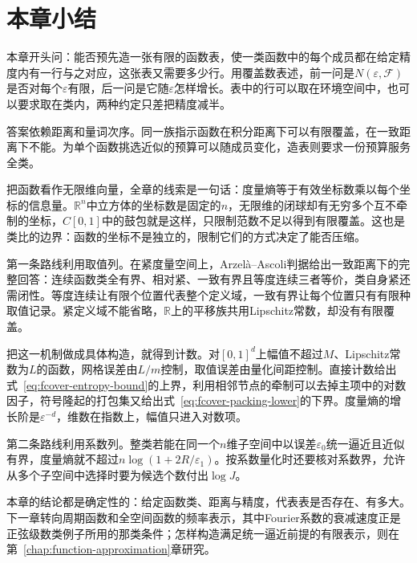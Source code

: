 \section{本章小结}
\label{sec:fcover-summary}

本章开头问：能否预先造一张有限的函数表，使一类函数中的每个成员都在给定精度内有一行与之对应，这张表又需要多少行。用覆盖数表述，前一问是$N(\varepsilon,\mathcal F)$是否对每个$\varepsilon$有限，后一问是它随$\varepsilon$怎样增长。表中的行可以取在环境空间中，也可以要求取在类内，两种约定只差把精度减半。

答案依赖距离和量词次序。同一族指示函数在积分距离下可以有限覆盖，在一致距离下不能。为单个函数挑选近似的预算可以随成员变化，造表则要求一份预算服务全类。

把函数看作无限维向量，全章的线索是一句话：度量熵等于有效坐标数乘以每个坐标的信息量。$\mathbb R^n$中立方体的坐标数是固定的$n$，无限维的闭球却有无穷多个互不牵制的坐标，$C[0,1]$中的鼓包就是这样，只限制范数不足以得到有限覆盖。这也是类比的边界：函数的坐标不是独立的，限制它们的方式决定了能否压缩。

第一条路线利用取值列。在紧度量空间上，Arzelà--Ascoli判据给出一致距离下的完整回答：连续函数类全有界、相对紧、一致有界且等度连续三者等价，类自身紧还需闭性。等度连续让有限个位置代表整个定义域，一致有界让每个位置只有有限种取值记录。紧定义域不能省略，$\mathbb R$上的平移族共用Lipschitz常数，却没有有限覆盖。

把这一机制做成具体构造，就得到计数。对$[0,1]^d$上幅值不超过$M$、Lipschitz常数为$L$的函数，网格误差由$L/m$控制，取值误差由量化间距控制。直接计数给出式~\eqref{eq:fcover-entropy-bound}的上界，利用相邻节点的牵制可以去掉主项中的对数因子，符号隆起的打包集又给出式~\eqref{eq:fcover-packing-lower}的下界。度量熵的增长阶是$\varepsilon^{-d}$，维数在指数上，幅值只进入对数项。

第二条路线利用系数列。整类若能在同一个$n$维子空间中以误差$\varepsilon_0$统一逼近且近似有界，度量熵就不超过$n\log(1+2R/\varepsilon_1)$。按系数量化时还要核对系数界，允许从多个子空间中选择时要为候选个数付出$\log J$。

本章的结论都是确定性的：给定函数类、距离与精度，代表表是否存在、有多大。下一章转向周期函数和全空间函数的频率表示，其中Fourier系数的衰减速度正是正弦级数类例子所用的那类条件；怎样构造满足统一逼近前提的有限表示，则在第~\ref{chap:function-approximation}章研究。

